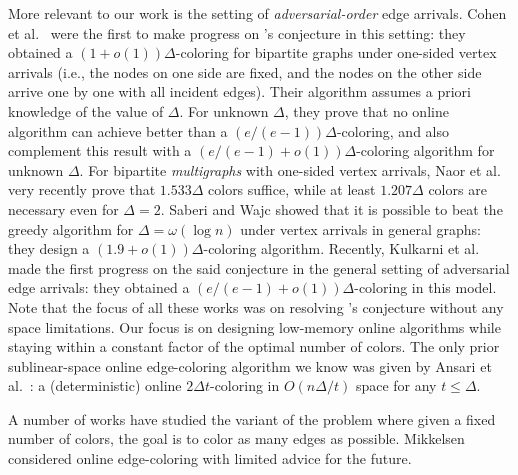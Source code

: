 \documentclass[10pt]{article}
\theoremstyle{definition}\newtheorem{definition}[lemma]{Definition}
\theoremstyle{remark}  \newtheorem*{remark}{Remark}
\begin{document}
More relevant to our work is the setting of \emph{adversarial-order} edge arrivals. Cohen et al.~\cite{CohenPW19} were the first to make progress on \cite{BarNoyMN92}'s conjecture in this setting: they obtained a $(1+o(1))\Delta$-coloring for bipartite graphs under one-sided vertex arrivals (i.e., the nodes on one side are fixed, and the nodes on the other side arrive one by one with all incident edges). Their algorithm assumes a priori knowledge of the value of $\Delta$. For unknown $\Delta$, they prove that no online algorithm can achieve better than a $(e/(e-1))\Delta$-coloring, and also complement this result with a $(e/(e-1) +o(1))\Delta$-coloring algorithm for unknown $\Delta$. For  bipartite \emph{multigraphs} with one-sided vertex arrivals, Naor et al.~\cite{NaorSW23} very recently prove that $1.533\Delta$ colors suffice, while at least $1.207\Delta$ colors are necessary even for $\Delta=2$. Saberi and Wajc \cite{SaberiW21} showed that it is possible to beat the greedy algorithm for $\Delta=\omega(\log n)$ under vertex arrivals in general graphs: they design a $(1.9+o(1))\Delta$-coloring algorithm. Recently, Kulkarni et al.~\cite{KulkarniLSST22} made the first progress on the said conjecture in the general setting of adversarial edge arrivals: they obtained a $(e/(e-1) +o(1))\Delta$-coloring in this model. Note that the focus of all these works was on resolving \cite{BarNoyMN92}'s conjecture without any space limitations. Our focus is on designing low-memory online algorithms while staying within a constant factor of the optimal number of colors. The only prior sublinear-space online edge-coloring algorithm we know was given by Ansari et al.~\cite{AnsariSZ22}: a (deterministic) online $2\Delta t$-coloring in $O(n\Delta/t)$ space for any $t\leq \Delta$.




A number of works \cite{FavrholdtN03, EhmsenFKM10, FavrholdtM18} have studied the variant of the problem where given a fixed number of colors, the goal is to color as many edges as possible. Mikkelsen \cite{Mikkelsen15, Mikkelsen16} considered online edge-coloring with limited advice for the future.
\end{document}
